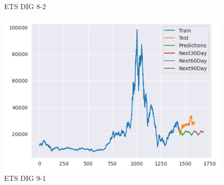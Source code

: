 \documentclass[conference]{IEEEtran}
\begin{document}
\begin{figure}[htbp]
\begin{minipage}{0.23\textwidth}
    \caption{ETS DIG 8-2}
    \label{fig:nvl_histogram}
    \end{minipage}
    \begin{minipage}{0.23\textwidth}
    \centering
    \includegraphics[width=1\textwidth]{experiment/ets/TEAM4_ETS_DIG_9_1.png}
    \caption{ETS DIG 9-1}
    \label{fig:nvl_histogram}
    \end{minipage}

    \vspace{0.5cm} %


\end{figure}
\end{document}
